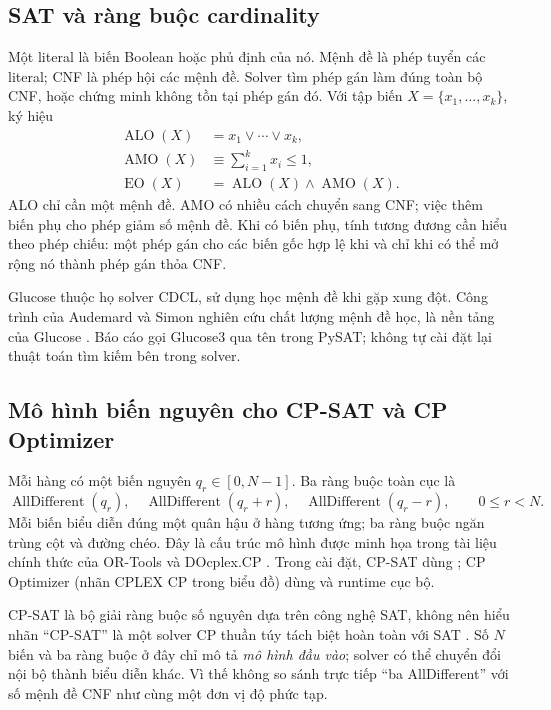 \documentclass[a4paper,fleqn]{cas-sc}
\newcommand{\AMO}{\operatorname{AMO}}
\newcommand{\ALO}{\operatorname{ALO}}
\newcommand{\EO}{\operatorname{EO}}
\newcommand{\AllDifferent}{\operatorname{AllDifferent}}
\newcommand{\code}[1]{\texttt{\detokenize{#1}}}
\begin{document}
\subsection{SAT và ràng buộc cardinality}
Một literal là biến Boolean hoặc phủ định của nó. Mệnh đề là phép tuyển các literal; CNF là phép hội các mệnh đề. Solver tìm phép gán làm đúng toàn bộ CNF, hoặc chứng minh không tồn tại phép gán đó. Với tập biến $X=\{x_1,\ldots,x_k\}$, ký hiệu
\begin{align}
 \ALO(X)&=x_1\lor\cdots\lor x_k,\\
 \AMO(X)&\equiv\sum_{i=1}^{k}x_i\leq1,\\
 \EO(X)&=\ALO(X)\land\AMO(X).
\end{align}
ALO chỉ cần một mệnh đề. AMO có nhiều cách chuyển sang CNF; việc thêm biến phụ cho phép giảm số mệnh đề. Khi có biến phụ, tính tương đương cần hiểu theo phép chiếu: một phép gán cho các biến gốc hợp lệ khi và chỉ khi có thể mở rộng nó thành phép gán thỏa CNF.

Glucose thuộc họ solver CDCL, sử dụng học mệnh đề khi gặp xung đột. Công trình của Audemard và Simon nghiên cứu chất lượng mệnh đề học, là nền tảng của Glucose \citep{glucose2009}. Báo cáo gọi Glucose3 qua tên \code{g3} trong PySAT; không tự cài đặt lại thuật toán tìm kiếm bên trong solver.

\subsection{Mô hình biến nguyên cho CP-SAT và CP Optimizer}\label{sec:cp}
Mỗi hàng có một biến nguyên $q_r\in[0,N-1]$. Ba ràng buộc toàn cục là
\begin{equation}\label{eq:cp}
 \AllDifferent(q_r),\quad
 \AllDifferent(q_r+r),\quad
 \AllDifferent(q_r-r),\qquad 0\leq r<N.
\end{equation}
Mỗi biến biểu diễn đúng một quân hậu ở hàng tương ứng; ba ràng buộc ngăn trùng cột và đường chéo. Đây là cấu trúc mô hình được minh họa trong tài liệu chính thức của OR-Tools và DOcplex.CP \citep{ortoolsqueens,docplexcp}. Trong cài đặt, CP-SAT dùng \code{CpModel}; CP Optimizer (nhãn CPLEX CP trong biểu đồ) dùng \code{CpoModel} và runtime cục bộ.

CP-SAT là bộ giải ràng buộc số nguyên dựa trên công nghệ SAT, không nên hiểu nhãn ``CP-SAT'' là một solver CP thuần túy tách biệt hoàn toàn với SAT \citep{ortoolscpsat}. Số $N$ biến và ba ràng buộc ở đây chỉ mô tả \emph{mô hình đầu vào}; solver có thể chuyển đổi nội bộ thành biểu diễn khác. Vì thế không so sánh trực tiếp ``ba AllDifferent'' với số mệnh đề CNF như cùng một đơn vị độ phức tạp.
\end{document}
